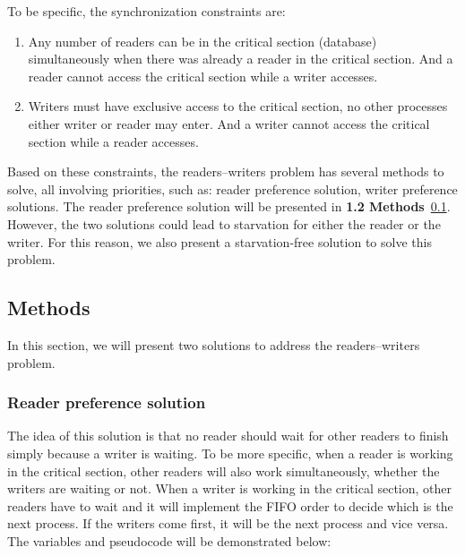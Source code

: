 \documentclass[a4paper, 10pt]{article}
\begin{document}
To be specific, the synchronization constraints are: 
\begin{enumerate}
    \item Any number of readers can be in the critical section (database) simultaneously when there was already a reader in the critical section. And a reader cannot access the critical section while a writer accesses.
    \item Writers must have exclusive access to the critical section, no other processes either writer or reader may enter. And a writer cannot access the critical section while a reader accesses.
\end{enumerate}
Based on these constraints, the readers–writers problem has several methods to solve, all involving priorities, such as: reader preference solution, writer preference solutions. The reader preference solution will be presented in \textbf{1.2 Methods}~\ref{rw_me}. However, the two solutions could lead to starvation for either the reader or the writer. For this reason, we also present a starvation-free solution to solve this problem.  
\subsection{Methods}\label{rw_me}
\quad In this section, we will present two solutions to address the readers–writers problem.
\subsubsection{Reader preference solution}\label{rw_sol1}
\quad The idea of this solution is that no reader should wait for other readers to finish simply because a writer is waiting. To be more specific, when a reader is working in the critical section, other readers will also work simultaneously, whether the writers are waiting or not. When a writer is working in the critical section, other readers have to wait and it will implement the FIFO order to decide which is the next process. If the writers come first, it will be the next process and vice versa.\\
\hspace*{1em}The variables and pseudocode will be demonstrated below: 
\end{document}
